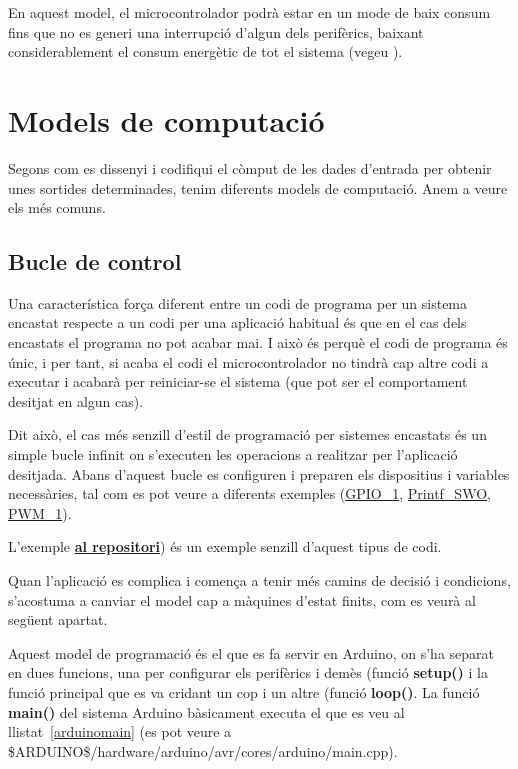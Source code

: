 En aquest model, el microcontrolador podrà estar en un mode de baix consum fins que no es generi una interrupció d'algun dels perifèrics, baixant considerablement el consum energètic de tot el sistema (vegeu ).

\chapter{Models de computació}
\label{ch:modescomputacio}

Segons com es dissenyi i codifiqui el còmput de les dades d'entrada per obtenir unes sortides determinades, tenim diferents models de computació. Anem a veure els més comuns.

\section{Bucle de control}
\label{sec:buclecontrol}

Una característica força diferent entre un codi de programa per un sistema encastat respecte a un codi per una aplicació habitual és que en el cas dels encastats el programa no pot acabar mai. I això és perquè el codi de programa és únic, i per tant, si acaba el codi el microcontrolador no tindrà cap altre codi a executar i acabarà per reiniciar-se el sistema (que pot ser el comportament desitjat en algun cas).

Dit això, el cas més senzill d'estil de programació per sistemes encastats és un simple bucle infinit on s'executen les operacions a realitzar per l'aplicació desitjada. Abans d'aquest bucle es configuren i preparen els dispositius i variables necessàries, tal com es pot veure a diferents exemples (\href{https://github.com/mariusmm/cursembedded/blob/master/Simplicity/GPIO_1/}{GPIO\_1}, \href{https://github.com/mariusmm/cursembedded/tree/master/Simplicity/Printf_SWO}{Printf\_SWO}, \href{https://github.com/mariusmm/cursembedded/blob/master/Simplicity/PWM_1/}{PWM\_1}). 

L'exemple  \href{https://github.com/mariusmm/cursembedded/tree/master/Simplicity/GPIO_1}{\bf al repositori}) és un exemple senzill d'aquest tipus de codi.

Quan l'aplicació es complica i comença a tenir més camins de decisió i condicions, s'acostuma a canviar el model cap a màquines d'estat finits, com es veurà al següent apartat.

Aquest model de programació és el que es fa servir en Arduino, on s'ha separat en dues funcions, una per configurar els perifèrics i demès (funció {\bf setup()} i la funció principal que es va cridant un cop i un altre (funció {\bf loop()}. La funció {\bf main()} del sistema Arduino bàsicament executa el que es veu al llistat~\ref{arduinomain} (es pot veure a \$ARDUINO\$/hardware/arduino/avr/cores/arduino/main.cpp).

